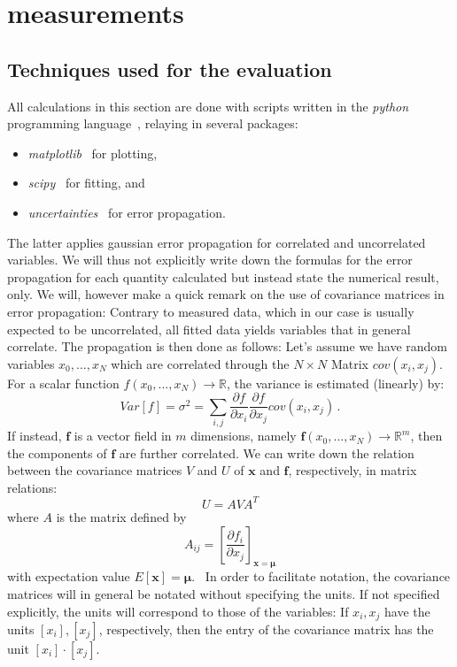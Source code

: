 \section{measurements}
\subsection{Techniques used for the evaluation}
All calculations in this section are done with scripts written in 
the \textit{python} programming language~\cite{python}, relaying in several 
packages:
\begin{itemize}
    \item
        \textit{matplotlib}~\cite{Hunter2007} for plotting,
    \item
        \textit{scipy}~\cite{scipy} for fitting, and 
    \item
        \textit{uncertainties}~\cite{uc} for error propagation.
\end{itemize}
The latter applies gaussian error propagation for correlated and uncorrelated variables. 
We will thus not explicitly write down the formulas for the error propagation 
for each quantity calculated but instead state the numerical result, only. 
We will, however make a quick remark on the use of covariance matrices in 
error propagation: Contrary to measured data, which in our case is usually 
expected to be uncorrelated, all fitted data yields variables that in general correlate. 
The propagation is then done as follows:
Let's assume we have random
variables $x_0,...,x_N$ which are correlated through the $N\times N$ Matrix $cov(x_i,x_j)$.
For a scalar function $f(x_0,...,x_N) \rightarrow \mathbb{R}$, the variance is estimated (linearly) by:
\begin{equation}
Var[f] = \sigma^2 = \sum_{i,j} \frac{\partial f}{\partial x_i} \frac{\partial f}{\partial x_j} cov(x_i,x_j) \,.
\end{equation} 
If instead, $\mathbf{f}$ is a vector field in $m$ dimensions, namely 
$\mathbf{f}(x_0,...,x_N) \rightarrow \mathbb{R}^m$, then the components of $\mathbf{f}$ 
are further correlated. We can write down the relation between the covariance matrices $V$ and $U$ of 
$\mathbf{x}$ and $\mathbf{f}$, respectively, in matrix relations:
\begin{equation}
    U = A V A^T
\end{equation}
where $A$ is the matrix defined by 
\begin{equation}
    A_{ij} = \left[ \frac{\partial f_i}{\partial x_j}\right]_{\mathbf{x} = \mathbf{\mu}}
\end{equation}
with expectation value $E[\mathbf{x}] = \mathbf{\mu}$.~\cite{cowan1998statistical}
In order to facilitate notation, the covariance matrices will in general be notated without 
specifying the units. If not specified explicitly, the units will correspond to those of the
variables: If $x_i, x_j$ have the units $[x_i], [x_j]$, respectively, 
then the entry of the covariance matrix has the unit $[x_i] \cdot [x_j]$. 


